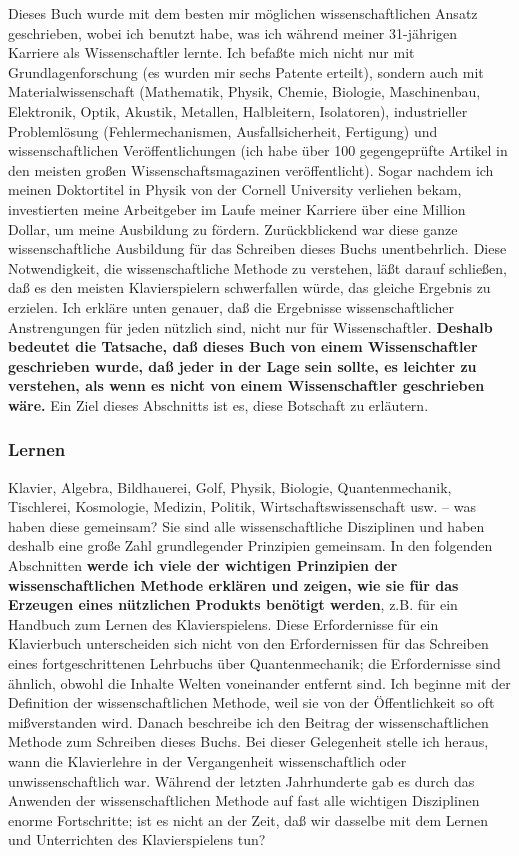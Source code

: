 Dieses Buch wurde mit dem besten mir möglichen wissenschaftlichen Ansatz geschrieben, wobei ich benutzt habe, was ich während meiner 31-jährigen Karriere als Wissenschaftler lernte.
Ich befaßte mich nicht nur mit Grundlagenforschung (es wurden mir sechs Patente erteilt), sondern auch mit Materialwissenschaft (Mathematik, Physik, Chemie, Biologie, Maschinenbau, Elektronik, Optik, Akustik, Metallen, Halbleitern, Isolatoren), industrieller Problemlösung (Fehlermechanismen, Ausfallsicherheit, Fertigung) und wissenschaftlichen Veröffentlichungen (ich habe über 100 gegengeprüfte Artikel in den meisten großen Wissenschaftsmagazinen veröffentlicht).
Sogar nachdem ich meinen Doktortitel in Physik von der Cornell University verliehen bekam, investierten meine Arbeitgeber im Laufe meiner Karriere über eine Million Dollar, um meine Ausbildung zu fördern.
Zurückblickend war diese ganze wissenschaftliche Ausbildung für das Schreiben dieses Buchs unentbehrlich.
Diese Notwendigkeit, die wissenschaftliche Methode zu verstehen, läßt darauf schließen, daß es den meisten Klavierspielern schwerfallen würde, das gleiche Ergebnis zu erzielen.
Ich erkläre unten genauer, daß die Ergebnisse wissenschaftlicher Anstrengungen für jeden nützlich sind, nicht nur für Wissenschaftler.
\textbf{Deshalb bedeutet die Tatsache, daß dieses Buch von einem Wissenschaftler geschrieben wurde, daß jeder in der Lage sein sollte, es leichter zu verstehen, als wenn es nicht von einem Wissenschaftler geschrieben wäre.}
Ein Ziel dieses Abschnitts ist es, diese Botschaft zu erläutern.


\subsubsection{Lernen}
\label{c3_2b}

Klavier, Algebra, Bildhauerei, Golf, Physik, Biologie, Quantenmechanik, Tischlerei, Kosmologie, Medizin, Politik, Wirtschaftswissenschaft usw. -- was haben diese gemeinsam?
Sie sind alle wissenschaftliche Disziplinen und haben deshalb eine große Zahl grundlegender Prinzipien gemeinsam.
In den folgenden Abschnitten \textbf{werde ich viele der wichtigen Prinzipien der wissenschaftlichen Methode erklären und zeigen, wie sie für das Erzeugen eines nützlichen Produkts benötigt werden}, z.B. für ein Handbuch zum Lernen des Klavierspielens.
Diese Erfordernisse für ein Klavierbuch unterscheiden sich nicht von den Erfordernissen für das Schreiben eines fortgeschrittenen Lehrbuchs über Quantenmechanik; die Erfordernisse sind ähnlich, obwohl die Inhalte Welten voneinander entfernt sind.
Ich beginne mit der Definition der wissenschaftlichen Methode, weil sie von der Öffentlichkeit so oft mißverstanden wird.
Danach beschreibe ich den Beitrag der wissenschaftlichen Methode zum Schreiben dieses Buchs.
Bei dieser Gelegenheit stelle ich heraus, wann die Klavierlehre in der Vergangenheit wissenschaftlich oder unwissenschaftlich war.
Während der letzten Jahrhunderte gab es durch das Anwenden der wissenschaftlichen Methode auf fast alle wichtigen Disziplinen enorme Fortschritte; ist es nicht an der Zeit, daß wir dasselbe mit dem Lernen und Unterrichten des Klavierspielens tun?

